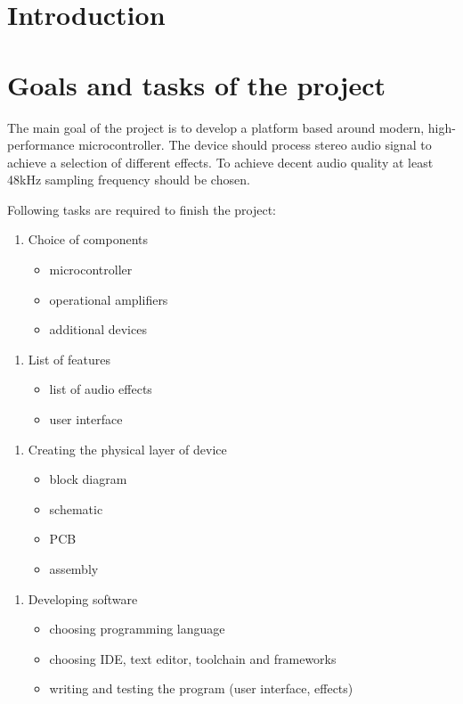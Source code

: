 \documentclass[a4paper,twoside,12pt]{book}
\begin{document}
\chapter{Introduction}



\chapter{Goals and tasks of the project}
The main goal of the project is to develop a platform based around modern, high-performance microcontroller.
The device should process stereo audio signal to achieve a selection of different effects.
To achieve decent audio quality at least 48kHz sampling frequency should be chosen.

Following tasks are required to finish the project:

\begin{enumerate}
    \item Choice of components
    \begin{itemize}
        \item microcontroller
        \item operational amplifiers
        \item additional devices
    \end{itemize}
\end{enumerate}

\begin{enumerate}
    \item List of features
    \begin{itemize}
        \item list of audio effects
        \item user interface
    \end{itemize}
\end{enumerate}

\begin{enumerate}
    \item Creating the physical layer of device
    \begin{itemize}
        \item block diagram
        \item schematic
        \item PCB
        \item assembly 
    \end{itemize}
\end{enumerate}

\begin{enumerate}
    \item Developing software
    \begin{itemize}
        \item choosing programming language
        \item choosing IDE, text editor, toolchain and frameworks
        \item writing and testing the program (user interface, effects)
    \end{itemize}
\end{enumerate}
\end{document}
